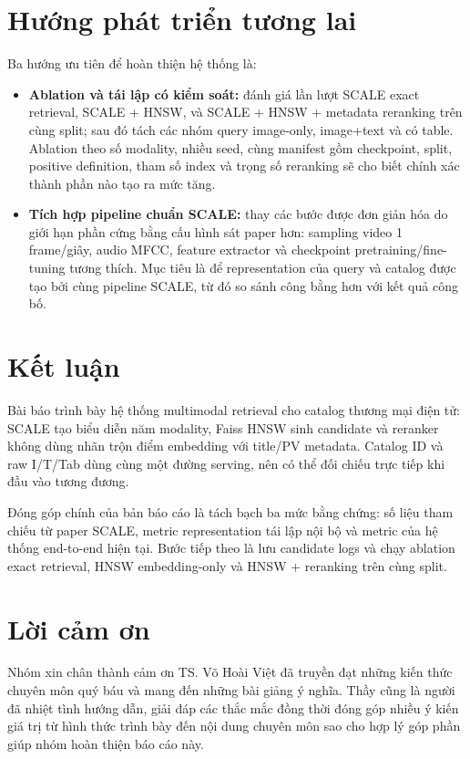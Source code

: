 \documentclass[10pt,conference]{IEEEtran}
\begin{document}
\section{Hướng phát triển tương lai}

Ba hướng ưu tiên để hoàn thiện hệ thống là:
\begin{itemize}[leftmargin=*]
    \item \textbf{Ablation và tái lập có kiểm soát:} đánh giá lần lượt SCALE exact retrieval, SCALE + HNSW, và SCALE + HNSW + metadata reranking trên cùng split; sau đó tách các nhóm query image-only, image+text và có table. Ablation theo số modality, nhiều seed, cùng manifest gồm checkpoint, split, positive definition, tham số index và trọng số reranking sẽ cho biết chính xác thành phần nào tạo ra mức tăng.
    \item \textbf{Tích hợp pipeline chuẩn SCALE:} thay các bước được đơn giản hóa do giới hạn phần cứng bằng cấu hình sát paper hơn: sampling video 1 frame/giây, audio MFCC, feature extractor và checkpoint pretraining/fine-tuning tương thích. Mục tiêu là để representation của query và catalog được tạo bởi cùng pipeline SCALE, từ đó so sánh công bằng hơn với kết quả công bố.
\end{itemize}

\section{Kết luận}

Bài báo trình bày hệ thống multimodal retrieval cho catalog thương mại điện tử: SCALE tạo biểu diễn năm modality, Faiss HNSW sinh candidate và reranker không dùng nhãn trộn điểm embedding với title/PV metadata. Catalog ID và raw I/T/Tab dùng cùng một đường serving, nên có thể đối chiếu trực tiếp khi đầu vào tương đương.

Đóng góp chính của bản báo cáo là tách bạch ba mức bằng chứng: số liệu tham chiếu từ paper SCALE, metric representation tái lập nội bộ và metric của hệ thống end-to-end hiện tại. Bước tiếp theo là lưu candidate logs và chạy ablation exact retrieval, HNSW embedding-only và HNSW + reranking trên cùng split.


\section*{Lời cảm ơn}
Nhóm xin chân thành cảm ơn TS. Võ Hoài Việt đã truyền đạt những kiến thức chuyên môn quý báu và mang đến những bài giảng ý nghĩa. Thầy cũng là người đã nhiệt tình hướng dẫn, giải đáp các thắc mắc đồng thời đóng góp nhiều ý kiến giá trị từ hình thức trình bày đến nội dung chuyên môn sao cho hợp lý góp phần giúp nhóm hoàn thiện báo cáo này.
\end{document}
